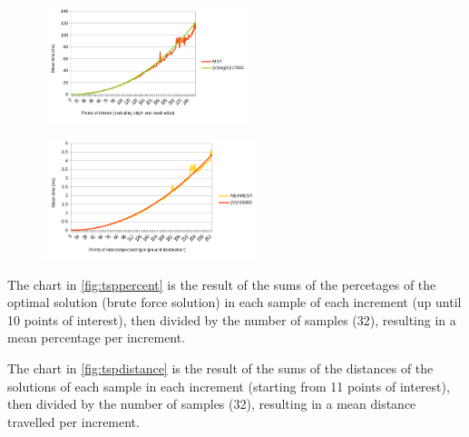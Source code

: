 \documentclass[a4paper, 12pt]{report}
\begin{document}
    \begin{figure}[H]
    \centering
    \begin{minipage}{.47\textwidth}
      \centering
      \includegraphics[width = 225px]{img/msttrend.png}
      \label{fig:msttrend}
    \end{minipage}%
    \hspace{.03\textwidth} 
    \begin{minipage}{.47\textwidth}
    \centering
      \includegraphics[width = 235px]{img/nearesttrend.png}
      \label{fig:nearesttrend}
    \end{minipage}
    \end{figure}
    The chart in \ref{fig:tsppercent} is the result of the sums of the percetages of the optimal solution (brute force solution) in each sample of each increment (up until 10 points of interest), then divided by the number of samples (32), resulting in a mean percentage per increment.
    
    The chart in \ref{fig:tspdistance} is the result of the sums of the distances of the solutions of each sample in each increment (starting from 11 points of interest), then divided by the number of samples (32), resulting in a mean distance travelled per increment.
    
\end{document}
